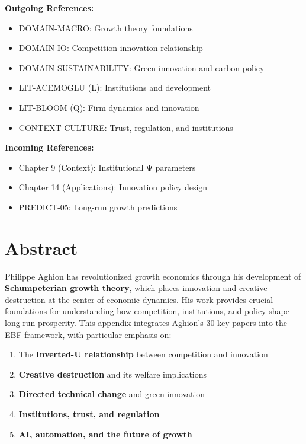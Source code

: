 \begin{tcolorbox}[colback=green!5!white, colframe=green!75!black, title=Cross-Reference Map]
\textbf{Outgoing References:}
\begin{itemize}[nosep]
    \item DOMAIN-MACRO: Growth theory foundations
    \item DOMAIN-IO: Competition-innovation relationship
    \item DOMAIN-SUSTAINABILITY: Green innovation and carbon policy
    \item LIT-ACEMOGLU (L): Institutions and development
    \item LIT-BLOOM (Q): Firm dynamics and innovation
    \item CONTEXT-CULTURE: Trust, regulation, and institutions
\end{itemize}

\textbf{Incoming References:}
\begin{itemize}[nosep]
    \item Chapter 9 (Context): Institutional Ψ parameters
    \item Chapter 14 (Applications): Innovation policy design
    \item PREDICT-05: Long-run growth predictions
\end{itemize}
\end{tcolorbox}

\section*{Abstract}

Philippe Aghion has revolutionized growth economics through his development of \textbf{Schumpeterian growth theory}, which places innovation and creative destruction at the center of economic dynamics. His work provides crucial foundations for understanding how competition, institutions, and policy shape long-run prosperity. This appendix integrates Aghion's 30 key papers into the EBF framework, with particular emphasis on:
\begin{enumerate}
    \item The \textbf{Inverted-U relationship} between competition and innovation
    \item \textbf{Creative destruction} and its welfare implications
    \item \textbf{Directed technical change} and green innovation
    \item \textbf{Institutions, trust, and regulation}
    \item \textbf{AI, automation, and the future of growth}
\end{enumerate}

